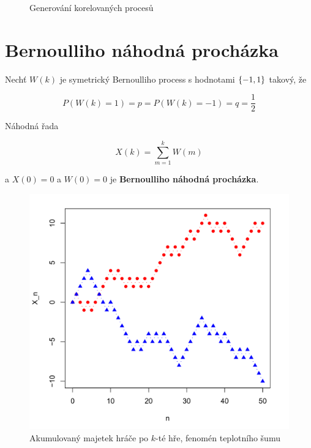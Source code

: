\begin{figure}
\caption{Generování korelovaných procesů}
\end{figure}

\section{Bernoulliho náhodná procházka}
Nechť $W(k)$ je symetrický Bernoulliho process s hodnotami $\left\{-1,1\right\}$ takový, že

\[ P(W(k)=1) = p = P(W(k)=-1)=q=\frac{1}{2} \]

Náhodná řada

\[ X(k) = \sum_{m=1}^k W(m) \]

a $X(0)=0$ a $W(0)=0$ je \textbf{Bernoulliho náhodná procházka}.

\begin{figure}
	\includegraphics[scale=0.3]{obrazky/random_walk.png}
	\caption{Akumulovaný majetek hráče po $k$-té hře, fenomén teplotního šumu}
\end{figure}

